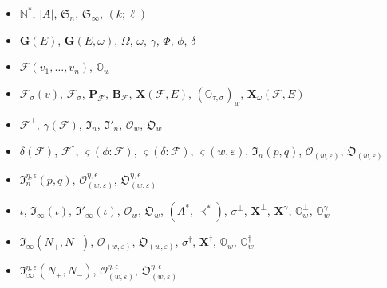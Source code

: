 \documentclass{amsart}
\theoremstyle{definition}
\newcommand{\bs}[1]{\boldsymbol{#1}}
\begin{document}
\begin{itemize}
\item[\S\ref{S.intro}:] $\mathbb{N}^*$, $|A|$, $\mathfrak{S}_n$, $\mathfrak{S}_\infty$, $(k;\ell)$

\smallskip
\item[\S\ref{S2.1}:] $\mathbf{G}(E)$, $\mathbf{G}(E,\omega)$, $\Omega$, $\omega$, $\gamma$, $\Phi$, $\phi$, $\delta$

\smallskip
\item[\S\ref{S2.2}:] $\mathcal{F}(v_1,\ldots,v_n)$, $\mathbb{O}_w$

\smallskip
\item[\S\ref{S2.3}:] $\mathcal{F}_\sigma(\underline{v})$, $\mathcal{F}_\sigma$,
$\mathbf{P}_\mathcal{F}$, $\mathbf{B}_\mathcal{F}$, $\mathbf{X}(\mathcal{F},E)$, $(\pmb{\mathbb{O}}_{\tau,\sigma})_w$, $\mathbf{X}_\omega(\mathcal{F},E)$

\smallskip
\item[\S\ref{S3.1}:] $\mathcal{F}^\perp$, $\gamma(\mathcal{F})$, $\mathfrak{I}_n$, $\mathfrak{I}'_n$, $\mathcal{O}_w$, $\mathfrak{O}_w$

\smallskip
\item[\S\ref{S3.2}:] $\delta(\mathcal{F})$, $\mathcal{F}^\dag$, $\varsigma(\phi:\mathcal{F})$, $\varsigma(\delta:\mathcal{F})$, $\varsigma(w,\varepsilon)$, $\mathfrak{I}_n(p,q)$, $\mathcal{O}_{(w,\varepsilon)}$, $\mathfrak{O}_{(w,\varepsilon)}$

\smallskip
\item[\S\ref{S3.3}:] $\mathfrak{I}^{\eta,\epsilon}_n(p,q)$, $\mathcal{O}^{\eta,\epsilon}_{(w,\varepsilon)}$, $\mathfrak{O}^{\eta,\epsilon}_{(w,\varepsilon)}$
\smallskip
\item[\S\ref{S4.1}:] $\iota$, $\mathfrak{I}_\infty(\iota)$, $\mathfrak{I}'_\infty(\iota)$, $\bs{\mathcal{O}}_w$, $\bs{\mathfrak{O}}_w$, $(A^*,\prec^*)$, $\sigma^\perp$, $\mathbf{X}^\perp$, $\mathbf{X}^\gamma$, $\pmb{\mathbb{O}}_w^\perp$, $\pmb{\mathbb{O}}_w^\gamma$
\smallskip
\item[\S\ref{S4.2}:] $\mathfrak{I}_\infty(N_+,N_-)$, $\bs{\mathcal{O}}_{(w,\varepsilon)}$, $\bs{\mathfrak{O}}_{(w,\varepsilon)}$, $\sigma^\dag$, $\mathbf{X}^\dag$, $\pmb{\mathbb{O}}_w$, $\pmb{\mathbb{O}}_w^\dag$
\smallskip
\item[\S\ref{S4.3}:] $\mathfrak{I}_\infty^{\eta,\epsilon}(N_+,N_-)$, $\bs{\mathcal{O}}_{(w,\varepsilon)}^{\eta,\epsilon}$, $\bs{\mathfrak{O}}_{(w,\varepsilon)}^{\eta,\epsilon}$ 
\end{itemize}
\end{document}

